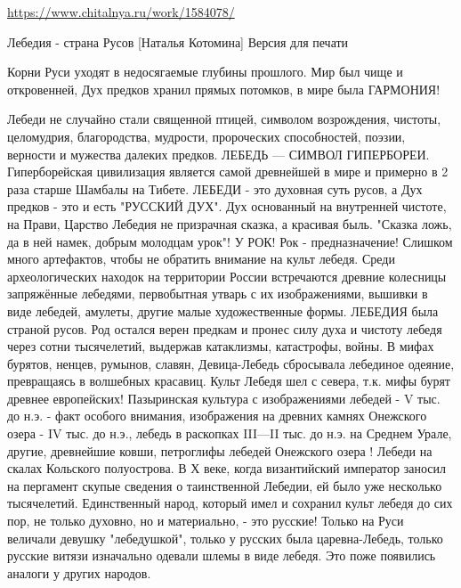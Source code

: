  
 

\url{https://www.chitalnya.ru/work/1584078/}

Лебедия - страна Русов
[Наталья Котомина]
 Версия для печати

Корни Руси уходят в недосягаемые глубины прошлого.
Мир был чище и  откровенней,   Дух предков хранил прямых потомков, в мире была ГАРМОНИЯ!
                                                                            
   Лебеди не случайно стали священной птицей, символом  возрождения, чистоты, целомудрия, благородства, мудрости, пророческих способностей, поэзии, верности и мужества далеких предков.
ЛЕБЕДЬ — СИМВОЛ ГИПЕРБОРЕИ.
Гиперборейская цивилизация является самой древнейшей в мире и примерно в 2 раза старше Шамбалы на Тибете.
ЛЕБЕДИ - это духовная суть русов, а Дух предков - это и есть "РУССКИЙ ДУХ".
Дух основанный на внутренней чистоте,  на Прави,
Царство Лебедия  не  призрачная  сказка, а  красивая быль.
 "Сказка ложь, да в ней намек, добрым молодцам урок"!  У  РОК!
Рок - предназначение!
Слишком много  артефактов, чтобы не обратить внимание на культ лебедя.  
Среди археологических находок на территории России встречаются древние колесницы запряжённые лебедями, первобытная утварь с их изображениями, вышивки в виде лебедей, амулеты, другие малые художественные формы.
ЛЕБЕДИЯ была страной русов.
 Род остался верен предкам и пронес силу духа  и чистоту лебедя через сотни тысячелетий, выдержав катаклизмы, катастрофы, войны.   
В мифах бурятов, ненцев, румынов, славян, Девица-Лебедь сбросывала лебединое одеяние, превращаясь в волшебных красавиц.
Культ Лебедя шел с севера, т.к. мифы бурят древнее европейских!
Пазыринская культура с изображениями лебедей - V тыс. до н.э. - факт особого внимания,  изображения  на древних камнях Онежского озера -  IV тыс. до н.э.,  лебедь в раскопках III—II тыс. до н.э. на Среднем Урале, другие, древнейшие ковши,  петроглифы лебедей Онежского озера !
Лебеди на скалах Кольского полуострова.
В Х веке, когда византийский император заносил на пергамент скупые сведения о таинственной Лебедии, ей  было уже несколько тысячелетий. 
Единственный народ, который имел и сохранил культ лебедя до сих пор,  не только духовно, но и материально, - это русские!                      
Только на Руси величали девушку "лебедушкой", только у русских была царевна-Лебедь, только русские витязи изначально одевали шлемы в виде лебедя. Это поже появились аналоги у других народов.
